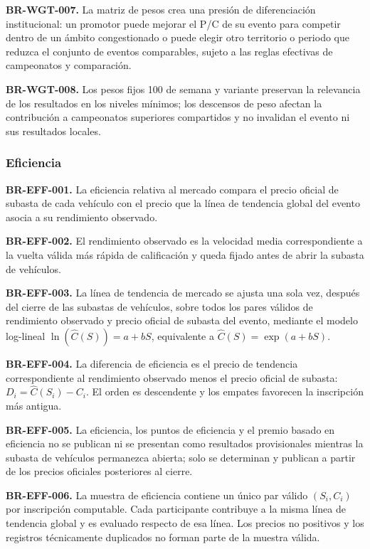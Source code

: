 \documentclass[10pt,letterpaper]{article}
\begin{document}
\noindent\textbf{BR-WGT-007.} La matriz de pesos crea una presión de diferenciación institucional: un promotor puede mejorar el P/C de su evento para competir dentro de un ámbito congestionado o puede elegir otro territorio o periodo que reduzca el conjunto de eventos comparables, sujeto a las reglas efectivas de campeonatos y comparación.\par
\noindent\textbf{BR-WGT-008.} Los pesos fijos 100 de semana y variante preservan la relevancia de los resultados en los niveles mínimos; los descensos de peso afectan la contribución a campeonatos superiores compartidos y no invalidan el evento ni sus resultados locales.\par
\subsubsection{Eficiencia}
\noindent\textbf{BR-EFF-001.} La eficiencia relativa al mercado compara el precio oficial de subasta de cada vehículo con el precio que la línea de tendencia global del evento asocia a su rendimiento observado.\par
\noindent\textbf{BR-EFF-002.} El rendimiento observado es la velocidad media correspondiente a la vuelta válida más rápida de calificación y queda fijado antes de abrir la subasta de vehículos.\par
\noindent\textbf{BR-EFF-003.} La línea de tendencia de mercado se ajusta una sola vez, después del cierre de las subastas de vehículos, sobre todos los pares válidos de rendimiento observado y precio oficial de subasta del evento, mediante el modelo log-lineal $\ln(\widehat{C}(S))=a+bS$, equivalente a $\widehat{C}(S)=\exp(a+bS)$.\par
\noindent\textbf{BR-EFF-004.} La diferencia de eficiencia es el precio de tendencia correspondiente al rendimiento observado menos el precio oficial de subasta: $D_i=\widehat{C}(S_i)-C_i$. El orden es descendente y los empates favorecen la inscripción más antigua.\par
\noindent\textbf{BR-EFF-005.} La eficiencia, los puntos de eficiencia y el premio basado en eficiencia no se publican ni se presentan como resultados provisionales mientras la subasta de vehículos permanezca abierta; solo se determinan y publican a partir de los precios oficiales posteriores al cierre.\par
\noindent\textbf{BR-EFF-006.} La muestra de eficiencia contiene un único par válido $(S_i,C_i)$ por inscripción computable. Cada participante contribuye a la misma línea de tendencia global y es evaluado respecto de esa línea. Los precios no positivos y los registros técnicamente duplicados no forman parte de la muestra válida.\par
\end{document}
